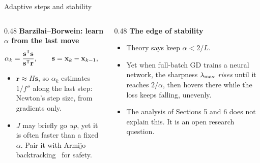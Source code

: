 \begin{frame}{Adaptive steps and stability}
  \begin{columns}[T]
    \begin{column}{0.48\textwidth}
      \textbf{Barzilai--Borwein: learn $\alpha$ from the last move}~\cite{barzilai1988}
      \small
      \[
        \alpha_k = \frac{\mathbf s^{\mathsf T}\mathbf s}{\mathbf s^{\mathsf T}\mathbf r},\qquad \mathbf s = \mathbf{x}_k - \mathbf{x}_{k-1},\ \ \mathbf r = \mathbf{g}_k - \mathbf{g}_{k-1}.
      \]
      \begin{itemize}\footnotesize
        \item $\mathbf r \approx H\mathbf s$, so $\alpha_k$ estimates $1/f''$ along the last step: Newton's step size, from gradients only.
        \item $J$ may briefly go \emph{up}, yet it is often faster than a fixed $\alpha$. Pair it with
              Armijo backtracking~\cite{armijo1966} for safety.
      \end{itemize}
    \end{column}
    \begin{column}{0.48\textwidth}
      \textbf{The edge of stability}~\cite{cohen2021}
      \begin{itemize}\small
        \item Theory says keep $\alpha < 2/L$.
        \item Yet when full-batch GD trains a neural network, the sharpness $\lambda_{\max}$ \emph{rises} until it reaches
              $2/\alpha$, then hovers there while the loss keeps falling, unevenly.
        \item The analysis of Sections 5 and 6 does not explain this. It is an open research question.
      \end{itemize}
    \end{column}
  \end{columns}
\end{frame}
